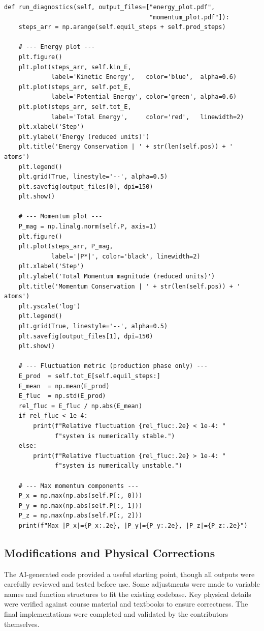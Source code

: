 \begin{lstlisting}[caption={Corrected \texttt{run\_diagnostics} method as returned by Claude.},
                   label={lst:ai_diagnostics}]
def run_diagnostics(self, output_files=["energy_plot.pdf",
                                        "momentum_plot.pdf"]):
    steps_arr = np.arange(self.equil_steps + self.prod_steps)
 
    # --- Energy plot ---
    plt.figure()
    plt.plot(steps_arr, self.kin_E,
             label='Kinetic Energy',   color='blue',  alpha=0.6)
    plt.plot(steps_arr, self.pot_E,
             label='Potential Energy', color='green', alpha=0.6)
    plt.plot(steps_arr, self.tot_E,
             label='Total Energy',     color='red',   linewidth=2)
    plt.xlabel('Step')
    plt.ylabel('Energy (reduced units)')
    plt.title('Energy Conservation | ' + str(len(self.pos)) + ' atoms')
    plt.legend()
    plt.grid(True, linestyle='--', alpha=0.5)
    plt.savefig(output_files[0], dpi=150)
    plt.show()
 
    # --- Momentum plot ---
    P_mag = np.linalg.norm(self.P, axis=1)
    plt.figure()
    plt.plot(steps_arr, P_mag,
             label='|P*|', color='black', linewidth=2)
    plt.xlabel('Step')
    plt.ylabel('Total Momentum magnitude (reduced units)')
    plt.title('Momentum Conservation | ' + str(len(self.pos)) + ' atoms')
    plt.yscale('log')
    plt.legend()
    plt.grid(True, linestyle='--', alpha=0.5)
    plt.savefig(output_files[1], dpi=150)
    plt.show()
 
    # --- Fluctuation metric (production phase only) ---
    E_prod  = self.tot_E[self.equil_steps:]
    E_mean  = np.mean(E_prod)
    E_fluc  = np.std(E_prod)
    rel_fluc = E_fluc / np.abs(E_mean)
    if rel_fluc < 1e-4:
        print(f"Relative fluctuation {rel_fluc:.2e} < 1e-4: "
              f"system is numerically stable.")
    else:
        print(f"Relative fluctuation {rel_fluc:.2e} > 1e-4: "
              f"system is numerically unstable.")
 
    # --- Max momentum components ---
    P_x = np.max(np.abs(self.P[:, 0]))
    P_y = np.max(np.abs(self.P[:, 1]))
    P_z = np.max(np.abs(self.P[:, 2]))
    print(f"Max |P_x|={P_x:.2e}, |P_y|={P_y:.2e}, |P_z|={P_z:.2e}")
\end{lstlisting}

\subsection{Modifications and Physical Corrections}

The AI-generated code provided a useful starting point, though all outputs were carefully reviewed and tested before use. Some adjustments were made to variable names and function structures to fit the existing codebase. Key physical details were verified against course material and textbooks to ensure correctness. The final implementations were completed and validated by the contributors themselves.
